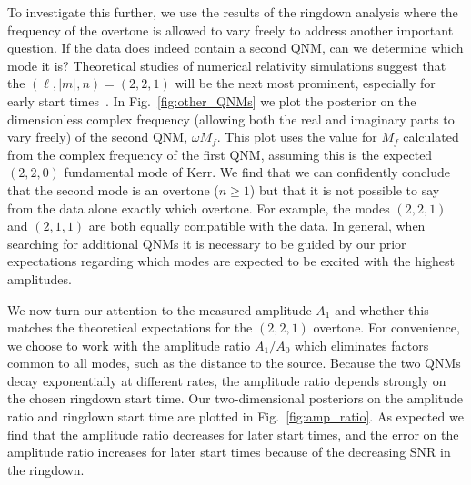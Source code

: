 To investigate this further, we use the results of the ringdown analysis where the frequency of the overtone is allowed to vary freely to address another important question. 
If the data does indeed contain a second QNM, can we determine which mode it is?
Theoretical studies of numerical relativity simulations suggest that the $(\ell,|m|,n)=(2,2,1)$ will be the next most prominent, especially for early start times~\cite{Giesler:2019uxc}. 
In Fig.~\ref{fig:other_QNMs} we plot the posterior on the dimensionless complex frequency (allowing both the real and imaginary parts to vary freely) of the second QNM, $\omega M_f$.
This plot uses the value for $M_f$ calculated from the complex frequency of the first QNM, assuming this is the expected $(2,2,0)$ fundamental mode of Kerr.
We find that we can confidently conclude that the second mode is an overtone ($n\geq 1$) but that it is not possible to say from the data alone exactly which overtone. 
For example, the modes $(2,2,1)$ and $(2,1,1)$ are both equally compatible with the data. 
In general, when searching for additional QNMs it is necessary to be guided by our prior expectations regarding which modes are expected to be excited with the highest amplitudes.

We now turn our attention to the measured amplitude $A_1$ and whether this matches the theoretical expectations for the $(2,2,1)$ overtone. 
For convenience, we choose to work with the amplitude ratio $A_1/A_0$ which eliminates factors common to all modes, such as the distance to the source. 
Because the two QNMs decay exponentially at different rates, the amplitude ratio depends strongly on the chosen ringdown start time.
Our two-dimensional posteriors on the amplitude ratio and ringdown start time are plotted in Fig.~\ref{fig:amp_ratio}.
As expected we find that the amplitude ratio decreases for later start times, and the error on the amplitude ratio increases for later start times because of the decreasing SNR in the ringdown.

